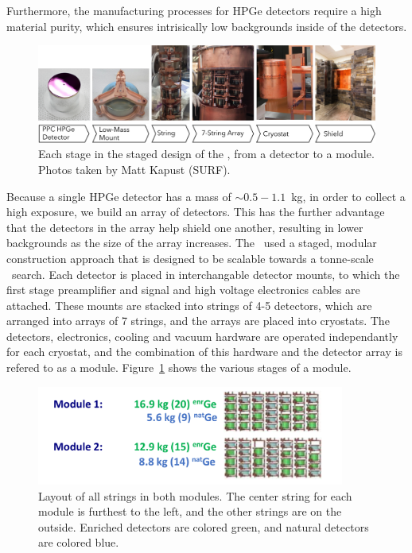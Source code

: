 \documentclass[/main.tex]{subfiles}
\begin{document}
Furthermore, the manufacturing processes for HPGe detectors require a high material purity, which ensures intrisically low backgrounds inside of the detectors.
\\
\begin{figure}[h]
  \centering
  \includegraphics[width=\textwidth]{Modular_Design}
  \caption[Modular design of the \MJD]{\label{fig:modulardesign}
    Each stage in the staged design of the \MJD, from a detector to a module. Photos taken by Matt Kapust (SURF).
  }
\end{figure}
Because a single HPGe detector has a mass of $\sim0.5-1.1$~kg, in order to collect a high exposure, we build an array of detectors.
This has the further advantage that the detectors in the array help shield one another, resulting in lower backgrounds as the size of the array increases.
The \MJD\ used a staged, modular construction approach that is designed to be scalable towards a tonne-scale \znbb\ search.
Each detector is placed in interchangable detector mounts, to which the first stage preamplifier and signal and high voltage electronics cables are attached.
These mounts are stacked into strings of 4-5 detectors, which are arranged into arrays of 7 strings, and the arrays are placed into cryostats.
The detectors, electronics, cooling and vacuum  hardware are operated independantly for each cryostat, and the combination of this hardware and the detector array is refered to as a module.
Figure~\ref{fig:modulardesign} shows the various stages of a module.
\\
\begin{figure}[h]
  \centering
  \includegraphics[width=0.9\textwidth]{modules}
  \caption[Layout of all strings in both modules with natural and enriched detectors labelled]{ \label{fig:modules}
    Layout of all strings in both modules. The center string for each module is furthest to the left, and the other strings are on the outside. Enriched detectors are colored green, and natural detectors are colored blue.
  }
\end{figure}
\end{document}
